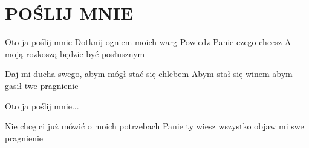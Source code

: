 \documentclass[../../../songbook.tex]{subfiles}
\begin{document}
\TabPositions{8cm} %
\section*{POŚLIJ MNIE}
{}
\vspace{0.5cm}
\-\hspace{1cm} Oto ja poślij mnie				 \newline
\-\hspace{1cm} Dotknij ogniem moich warg			 \newline
\-\hspace{1cm} Powiedz Panie czego chcesz			 \newline
\-\hspace{1cm} A moją rozkoszą będzie być posłusznym	 \newline

Daj mi ducha swego, abym mógł stać się chlebem	 \newline
Abym stał się winem abym gasił twe pragnienie \newline

\-\hspace{1cm} Oto ja poślij mnie... \newline

Nie chcę ci już mówić o moich potrzebach \newline
Panie ty wiesz wszystko objaw mi swe pragnienie \newline
\end{document}

